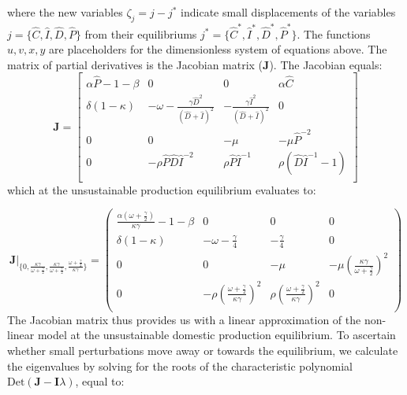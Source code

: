 \documentclass[9pt,twoside,lineno]{pnas-new}
\begin{document}
%
where the new variables $\zeta_{j} = j - j^{*}$ indicate small displacements of the variables $j = \{\hat{C}, \hat{I}, \hat{D}, \hat{P}\}$ from their equilibriums $j^{*} = \{\hat{C}^{*}, \hat{I}^{*}, \hat{D}^{*}, \hat{P}^{*}\}$. The functions $u, v, x, y$ are placeholders for the dimensionless system of equations above. The matrix of partial derivatives is the Jacobian matrix ($\boldsymbol{J}$). The Jacobian equals:
%
\begin{equation}
  \boldsymbol{J} =
  \begin{bmatrix}
    \alpha \hat{P} - 1 -\beta &
    0 &
    0 &
    \alpha \hat{C}\\
    \delta ( 1 - \kappa) &
    -\omega - \frac{\gamma \hat{D}^2}{(\hat{D} + \hat{I})^2} &
    - \frac{\gamma \hat{I}^2}{ (\hat{D} + \hat{I})^2} &
    0 \\
    0 &
    0 &
    -\mu &
    -\mu \hat{P}^{-2} \\
    0 &
    -\rho \hat{P} \hat{D} \hat{I}^{-2} &
    \rho \hat{P} \hat{I}^{-1} &
    \rho (\hat{D} \hat{I}^{-1} - 1) \\
  \end{bmatrix}
\end{equation}
%
which at the unsustainable production equilibrium evaluates to:

\begin{equation}
  \boldsymbol{J} \Big |_{\big \{0, \frac{\kappa \gamma}{\omega + \frac{\gamma}{2}}, \frac{\kappa \gamma}{\omega + \frac{\gamma}{2}}, \frac{\omega + \frac{\gamma}{2}}{\kappa \gamma}\big \}} =
  \begin{pmatrix}
    \frac{\alpha(\omega + \frac{\gamma}{2})}{\kappa \gamma} - 1 - \beta   &    0     &     0    &  0 \\
    \delta (1 - \kappa) & - \omega - \frac{\gamma}{4}  &  - \frac{\gamma}{4} & 0 \\
    0      &           0            & -\mu     & - \mu (\frac{\kappa \gamma}{\omega + \frac{\gamma}{2}})^2\\
    0      &   - \rho (\frac{\omega + \frac{\gamma}{2}}{\kappa \gamma})^2    & \rho (\frac{\omega + \frac{\gamma}{2}}{\kappa \gamma})^2 & 0 \\
  \end{pmatrix}
\end{equation}
%
The Jacobian matrix thus provides us with a linear approximation of the non-linear model at the unsustainable domestic production equilibrium. To ascertain whether small perturbations move away or towards the equilibrium, we calculate the eigenvalues by solving for the roots of the characteristic polynomial $\text{Det}(\mathbf{J} - \mathbf{I}\lambda)$, equal to:
\end{document}
